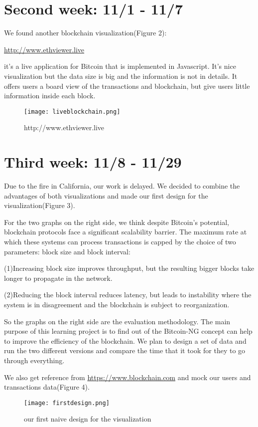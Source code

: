 \documentclass[a4paper]{article}
\begin{document}
\section{Second week: 11/1 - 11/7}
We found another blockchain visualization(Figure 2):

\href{http://www.ethviewer.live}{http://www.ethviewer.live}

it’s a live application for Bitcoin that is implemented in Javascript. It’s nice visualization but the data size is big and the information is not in details. It offers users a board view of the transactions and blockchain, but give users little information inside each block. 
\begin{figure}
\centering
\texttt{[image: liveblockchain.png]}
\caption{\label{fig:data}http://www.ethviewer.live}
\end{figure}

\section{Third week: 11/8 - 11/29}
Due to the fire in California, our work is delayed. We decided to combine the advantages of both visualizations and made our first design for the visualization(Figure 3).

For the two graphs on the right side, we think despite Bitcoin’s potential, blockchain protocols face a significant scalability barrier. The maximum rate at which these systems can process transactions is capped by the choice of two parameters: block size and block interval:

	(1)Increasing block size improves throughput, but the resulting bigger blocks take longer to propagate in the network.
	
	(2)Reducing the block interval reduces latency, but leads to instability where the system is in disagreement and the blockchain is subject to reorganization.
	
So the graphs on the right side are the evaluation methodology. The main purpose of this learning project is to find out of the Bitcoin-NG concept can help to improve the efficiency of the blockchain. We plan to design a set of data and run the two different versions and compare the time that it took for they to go through everything.

We also get reference from \href{https://www.blockchain.com}{https://www.blockchain.com} and mock our users and transactions data(Figure 4).
\begin{figure}
\centering
\texttt{[image: firstdesign.png]}
\caption{\label{fig:data}our first naive design for the visualization}
\end{figure}
\end{document}
